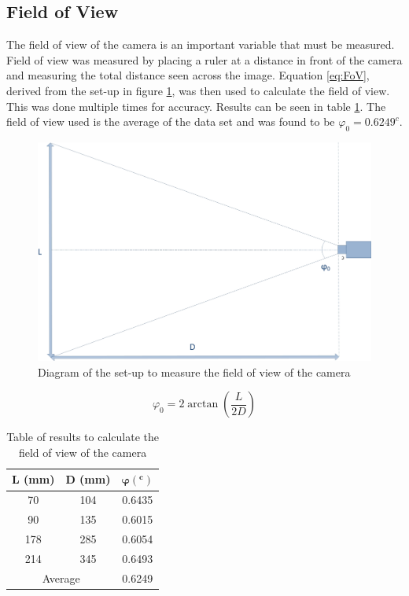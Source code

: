 \subsection{Field of View}
The field of view of the camera is an important variable that must be measured. Field of view was measured by placing a ruler at a distance in front of the camera and measuring the total distance seen across the image. Equation \eqref{eq:FoV}, derived from the set-up in figure \ref{fig:FoV}, was then used to calculate the field of view. This was done multiple times for accuracy. Results can be seen in table \ref{table:fieldofview}. The field of view used is the average of the data set and was found to be $\varphi_0 = 0.6249^c$. 
\begin{figure}
\includegraphics[width=\textwidth]{Figures/FoV.jpg}
\caption{Diagram of the set-up to measure the field of view of the camera}
\label{fig:FoV}
\end{figure}
\begin{equation}\label{eq:FoV}
\varphi_0 = 2\arctan\left(\frac{L}{2D}\right)
\end{equation}
\begin{table}
\caption{Table of results to calculate the field of view of the camera}
\label{table:fieldofview}
\centering
\begin{tabular}{ccc} \toprule
\textbf{L (mm)} & \textbf{D (mm)} &$\boldsymbol{\varphi (^c)}$ \\ \toprule
70 & 104 & 0.6435\\\midrule
90 & 135 &0.6015\\\midrule
178 & 285 &0.6054\\ \midrule
214 & 345 &0.6493 \\ \bottomrule
\multicolumn{2}{c}{Average} & 0.6249 \\ \bottomrule
\end{tabular}

\end{table}



